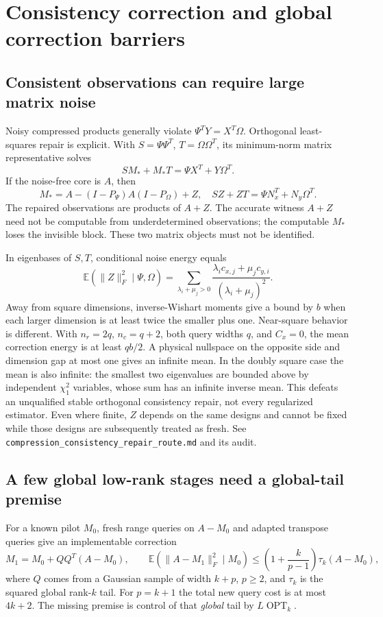 \documentclass[11pt,oneside,openany,a4paper]{book}
\numberwithin{equation}{chapter}
\theoremstyle{definition}
\theoremstyle{remark}
\newcommand{\sourcefile}[1]{{\small\nolinkurl{#1}}}
\begin{document}
\section{Consistency correction and global correction barriers}
\label{upd:sec:later-compression}

\subsection{Consistent observations can require large matrix noise}

Noisy compressed products generally violate
$\Psi^TY=X^T\Omega$.  Orthogonal least-squares repair is explicit.
With $S=\Psi\Psi^T$, $T=\Omega\Omega^T$, its minimum-norm matrix
representative solves
\[
 SM_*+M_*T=\Psi X^T+Y\Omega^T.
\]
If the noise-free core is $A$, then
\[
 M_*=A-(I-P_\Psi)A(I-P_\Omega)+Z,
 \quad SZ+ZT=\Psi N_x^T+N_y\Omega^T.
\]
The repaired observations are products of $A+Z$.  The accurate witness
$A+Z$ need not be computable from underdetermined observations; the
computable $M_*$ loses the invisible block.  These two matrix objects
must not be identified.

In eigenbases of $S,T$, conditional noise energy equals
\[
 \mathbb E(\|Z\|_F^2\mid\Psi,\Omega)
 =\sum_{\lambda_i+\mu_j>0}
   \frac{\lambda_i c_{x,j}+\mu_j c_{y,i}}
        {(\lambda_i+\mu_j)^2}.
\]
Away from square dimensions, inverse-Wishart moments give a bound by
$b$ when each larger dimension is at least twice the smaller plus one.
Near-square behavior is different.  With $n_r=2q$, $n_c=q+2$, both
query widths $q$, and $C_x=0$, the mean correction energy is at least
$qb/2$.  A physical nullspace on the opposite side and dimension gap
at most one gives an infinite mean.  In the doubly square case the
mean is also infinite: the smallest two eigenvalues are bounded above
by independent $\chi^2_1$ variables, whose sum has an infinite inverse
mean.  This defeats an unqualified stable orthogonal consistency
repair, not every regularized estimator.  Even where finite, $Z$ depends
on the same designs and cannot be fixed while those designs are
subsequently treated as fresh.
See \sourcefile{compression_consistency_repair_route.md} and its audit.

\subsection{A few global low-rank stages need a global-tail premise}

For a known pilot $M_0$, fresh range queries on $A-M_0$ and adapted
transpose queries give an implementable correction
\[
 M_1=M_0+QQ^T(A-M_0),\qquad
 \mathbb E(\|A-M_1\|_F^2\mid M_0)
 \le\left(1+\frac{k}{p-1}\right)\tau_k(A-M_0),
\]
where $Q$ comes from a Gaussian sample of width $k+p$, $p\ge2$, and
$\tau_k$ is the squared global rank-$k$ tail.  For $p=k+1$ the total
new query cost is at most $4k+2$.  The missing premise is control of
that \emph{global} tail by $L\operatorname{OPT}_k$.
\end{document}
